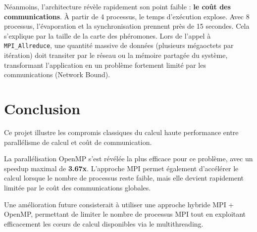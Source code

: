 \documentclass[12pt, a4paper]{article}
\begin{document}
Néanmoins, l'architecture révèle rapidement son point faible : \textbf{le coût des communications}. À partir de 4 processus, le temps d'exécution explose. Avec 8 processus, l'évaporation et la synchronisation prennent près de 15 secondes. Cela s'explique par la taille de la carte des phéromones. Lors de l'appel à \texttt{MPI\_Allreduce}, une quantité massive de données (plusieurs mégaoctets par itération) doit transiter par le réseau ou la mémoire partagée du système, transformant l'application en un problème fortement limité par les communications (Network Bound).

\section{Conclusion}

Ce projet illustre les compromis classiques du calcul haute performance entre parallélisme de calcul et coût de communication.

La parallélisation OpenMP s’est révélée la plus efficace pour ce problème, avec un speedup maximal de \textbf{3.67x}. L’approche MPI permet également d’accélérer le calcul lorsque le nombre de processus reste faible, mais elle devient rapidement limitée par le coût des communications globales.

Une amélioration future consisterait à utiliser une approche hybride MPI + OpenMP, permettant de limiter le nombre de processus MPI tout en exploitant efficacement les cœurs de calcul disponibles via le multithreading.
\end{document}
